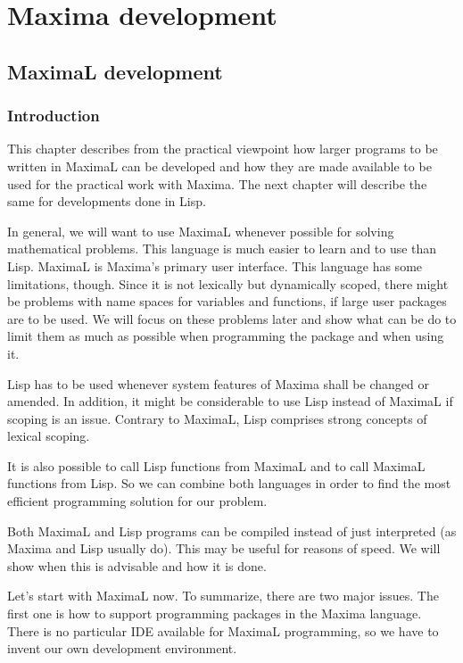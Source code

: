 \documentclass[../Maxima_Workbook.tex]{subfiles}
\begin{document}
\part{Maxima development}

\chapter{MaximaL development}

\section{Introduction}

This chapter describes from the practical viewpoint how larger programs to be written in MaximaL can be developed and how they are made available to be used for the practical work with Maxima. The next chapter will describe the same for developments done in Lisp. 

\lz In general, we will want to use MaximaL whenever possible for solving mathematical problems. This language is much easier to learn and to use than Lisp. MaximaL is Maxima's primary user interface. This language has some limitations, though. Since it is not lexically but dynamically scoped, there might be problems with name spaces for variables and functions, if large user packages are to be used. We will focus on these problems later and show what can be do to limit them as much as possible when programming the package and when using it.

\lz Lisp has to be used whenever system features of Maxima shall be changed or amended. In addition, it might be considerable to use Lisp instead of MaximaL if scoping is an issue. Contrary to MaximaL, Lisp comprises strong concepts of lexical scoping.

\lz It is also possible to call Lisp functions from MaximaL and to call MaximaL functions from Lisp. So we can combine both languages in order to find the most efficient programming solution for our problem.

\lz Both MaximaL and Lisp programs can be compiled instead of just interpreted (as Maxima and Lisp usually do). This may be useful for reasons of speed. We will show when this is advisable and how it is done.

\lz Let's start with MaximaL now. To summarize, there are two major issues. The first one is how to support programming packages in the Maxima language. There is no particular IDE available for MaximaL programming, so we have to invent our own development environment.
\end{document}
